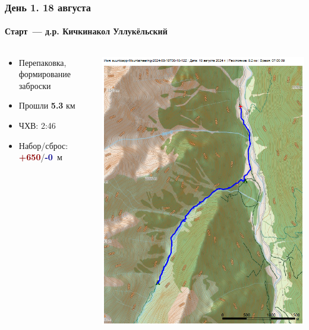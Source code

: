	\begin{frame}
	\frametitle{День 1. 18 августа}
	\framesubtitle{Старт~--- д.р. Кичкинакол Уллукёльский} %
	\begin{columns}[c] %
		\begin{column}{0.45\textwidth} %
			\begin{itemize}
				\item Перепаковка, формирование заброски
				\item Прошли \textbf{5.3} км
				\item ЧХВ: 2:46
				\item Набор/сброс: \textcolor{darkred}{\textbf{+650}}/\textcolor{darkblue}{\textbf{-0}}~м
			\end{itemize}
			
		\end{column}
		\begin{column}{0.5\textwidth} %
			\centering
			\includegraphics[width=\linewidth]{../pics/mini_maps/18}
		\end{column}
	\end{columns}
\end{frame}

